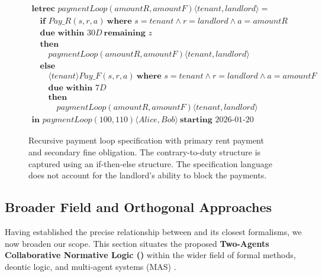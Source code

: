 \begin{figure}[ht]
  \centering
  \begin{minipage}{0.92\textwidth}
  \[
  \begin{array}{l}
  \textbf{letrec } \mathit{paymentLoop}(\mathit{amountR}, \mathit{amountF})
  \langle \mathit{tenant}, \mathit{landlord} \rangle = \\[2pt]
  \quad \textbf{if } \mathit{Pay\_R}(s,r,a)
  \ \textbf{where } s=\mathit{tenant} \land r=\mathit{landlord} \land a=\mathit{amountR} \\[-1pt]
  \quad \textbf{due within } 30D \ \textbf{remaining } z \\[2pt]
  \quad \textbf{then } \\[-1pt]
  \qquad \mathit{paymentLoop}(\mathit{amountR}, \mathit{amountF})
  \langle \mathit{tenant}, \mathit{landlord} \rangle \\[2pt]
  \quad \textbf{else } \\[-1pt]
  \qquad \langle \mathit{tenant} \rangle \mathit{Pay\_F}(s,r,a)
  \ \textbf{where } s=\mathit{tenant} \land r=\mathit{landlord} \land a=\mathit{amountF} \\[-1pt]
  \qquad \textbf{due within } 7D \\[2pt]
  \qquad \textbf{then } \\
  \qquad\quad \mathit{paymentLoop}(\mathit{amountR}, \mathit{amountF})
  \langle \mathit{tenant}, \mathit{landlord} \rangle \\[4pt]
  \textbf{in } \mathit{paymentLoop}(100,110)
  \langle \mathit{Alice}, \mathit{Bob} \rangle
  \ \textbf{starting } 2026\text{-}01\text{-}20
  \end{array}
  \]
  \end{minipage}
  \caption{Recursive payment loop specification with primary rent payment and secondary fine obligation.
  The contrary-to-duty structure is captured using an if-then-else structure. The specification language does not account for the landlord's ability to block the payments.}
  \label{fig:csl-payment-loop}
  \end{figure}

\subsection{Broader Field and Orthogonal Approaches}
Having established the precise relationship between \cDL and its closest formalisms, we now broaden our scope. This section situates the proposed \textbf{Two-Agents Collaborative Normative Logic (\cDL)} within the wider field of formal methods, deontic logic, and multi-agent systems (MAS) \cite{bulling2015strategic,HvitvedKZ12}.

